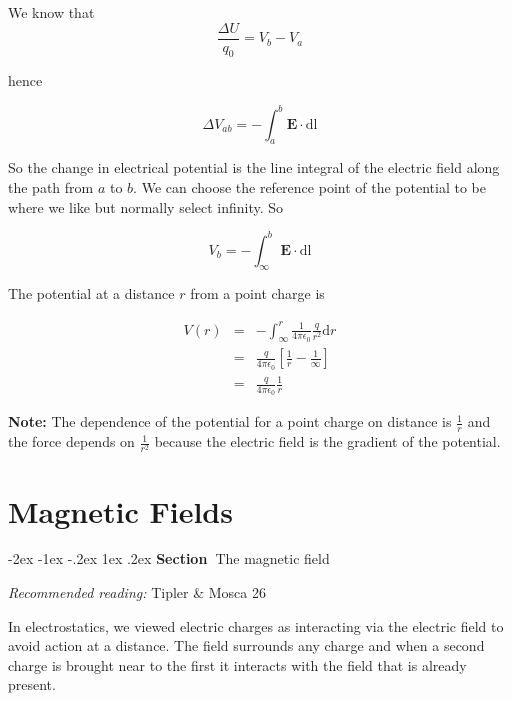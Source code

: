 \documentclass[
]{book}
\makeatletter
\renewcommand\section{%
\@startsection{section}{1}{\z@}%
              {-2ex \@plus -1ex \@minus -.2ex}%
              {1ex \@plus .2ex}%
              {\sffamily\bfseries\large\noindent Section~}}
\numberwithin{equation}{section}
\makeatother
\begin{document}
We know that
\begin{equation}
\label{eq:DeltaU2}
\frac{\Delta U}{q_0} = V_b - V_a
\end{equation}

hence

\begin{equation}
\label{eq:DeltaVab}
\Delta V_{ab} = -\int_a^b \mathbf{E} \cdot \mathrm{d}\mathrm{l}
\end{equation}

So the change in electrical potential is the line integral of the
electric field along the path from \(a\) to \(b\). We can choose the
reference point of the potential to be where we like but normally select
infinity. So

\begin{equation}
\label{eq:Vb}
V_b = -\int_\infty^b \mathbf{E} \cdot \mathrm{d}\mathrm{l}
\end{equation}

The potential at a distance \(r\) from a point charge is

\begin{equation}
\label{eq:V-r}
\begin{array}{rcll}
V(r) &=& -\int_\infty^r \frac{1}{4\pi\epsilon_0} \frac{q}{r^2} \mathrm{d} r \\
     &=& \frac{q}{4\pi\epsilon_0} \left[ \frac{1}{r} - \frac{1}{\infty} \right] \\
     &=& \frac{q}{4\pi\epsilon_0} \frac{1}{r}
\end{array}
\end{equation}

\textbf{Note:} The dependence of the potential for a point charge on distance
is \(\frac{1}{r}\) and the force depends on \(\frac{1}{r^2}\) because the
electric field is the gradient of the potential.

\hypertarget{magnetic-fields}{%
\chapter{Magnetic Fields}\label{magnetic-fields}}

\hypertarget{the-magnetic-field}{%
\section{The magnetic field}\label{the-magnetic-field}}

\emph{Recommended reading:} Tipler \& Mosca 26

In electrostatics, we viewed electric charges as interacting via the
electric field to avoid action at a distance. The field surrounds any
charge and when a second charge is brought near to the first it
interacts with the field that is already present.
\end{document}
